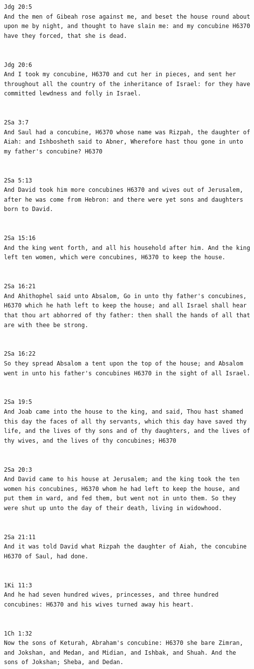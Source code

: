 \documentclass[11pt]{article}
\begin{document}
{\begin{lstlisting}
Jdg 20:5
And the men of Gibeah rose against me, and beset the house round about upon me by night, and thought to have slain me: and my concubine H6370 have they forced, that she is dead.


Jdg 20:6
And I took my concubine, H6370 and cut her in pieces, and sent her throughout all the country of the inheritance of Israel: for they have committed lewdness and folly in Israel.


2Sa 3:7
And Saul had a concubine, H6370 whose name was Rizpah, the daughter of Aiah: and Ishbosheth said to Abner, Wherefore hast thou gone in unto my father's concubine? H6370


2Sa 5:13
And David took him more concubines H6370 and wives out of Jerusalem, after he was come from Hebron: and there were yet sons and daughters born to David.


2Sa 15:16
And the king went forth, and all his household after him. And the king left ten women, which were concubines, H6370 to keep the house.


2Sa 16:21
And Ahithophel said unto Absalom, Go in unto thy father's concubines, H6370 which he hath left to keep the house; and all Israel shall hear that thou art abhorred of thy father: then shall the hands of all that are with thee be strong.


2Sa 16:22
So they spread Absalom a tent upon the top of the house; and Absalom went in unto his father's concubines H6370 in the sight of all Israel.


2Sa 19:5
And Joab came into the house to the king, and said, Thou hast shamed this day the faces of all thy servants, which this day have saved thy life, and the lives of thy sons and of thy daughters, and the lives of thy wives, and the lives of thy concubines; H6370


2Sa 20:3
And David came to his house at Jerusalem; and the king took the ten women his concubines, H6370 whom he had left to keep the house, and put them in ward, and fed them, but went not in unto them. So they were shut up unto the day of their death, living in widowhood.


2Sa 21:11
And it was told David what Rizpah the daughter of Aiah, the concubine H6370 of Saul, had done.


1Ki 11:3
And he had seven hundred wives, princesses, and three hundred concubines: H6370 and his wives turned away his heart.


1Ch 1:32
Now the sons of Keturah, Abraham's concubine: H6370 she bare Zimran, and Jokshan, and Medan, and Midian, and Ishbak, and Shuah. And the sons of Jokshan; Sheba, and Dedan.



\end{lstlisting}}
\end{document}
